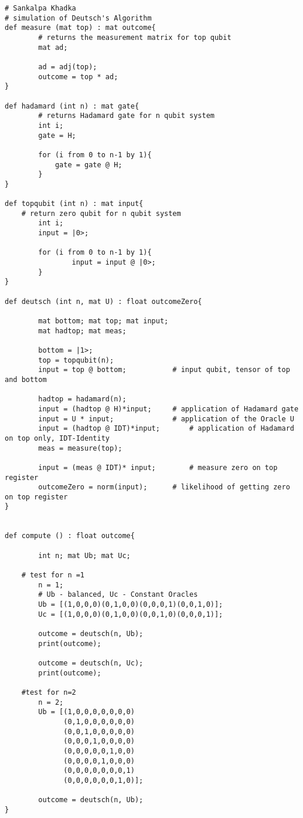 \begin{lstlisting}
# Sankalpa Khadka
# simulation of Deutsch's Algorithm
def measure (mat top) : mat outcome{
        # returns the measurement matrix for top qubit
        mat ad;

        ad = adj(top);
        outcome = top * ad;
}

def hadamard (int n) : mat gate{
        # returns Hadamard gate for n qubit system
        int i;
        gate = H;

        for (i from 0 to n-1 by 1){
            gate = gate @ H; 
        }
}

def topqubit (int n) : mat input{
	# return zero qubit for n qubit system
        int i;
        input = |0>;

        for (i from 0 to n-1 by 1){
                input = input @ |0>;
        }          
}

def deutsch (int n, mat U) : float outcomeZero{

        mat bottom; mat top; mat input;
        mat hadtop; mat meas;

        bottom = |1>;					
        top = topqubit(n);
        input = top @ bottom;			# input qubit, tensor of top and bottom
        
        hadtop = hadamard(n);		
        input = (hadtop @ H)*input;		# application of Hadamard gate
        input = U * input;				# application of the Oracle U
        input = (hadtop @ IDT)*input;		# application of Hadamard on top only, IDT-Identity
        meas = measure(top);

        input = (meas @ IDT)* input;		# measure zero on top register
        outcomeZero = norm(input);		# likelihood of getting zero on top register
}


def compute () : float outcome{

        int n; mat Ub; mat Uc;
	
	# test for n =1
        n = 1;
        # Ub - balanced, Uc - Constant Oracles
        Ub = [(1,0,0,0)(0,1,0,0)(0,0,0,1)(0,0,1,0)];
        Uc = [(1,0,0,0)(0,1,0,0)(0,0,1,0)(0,0,0,1)];

        outcome = deutsch(n, Ub);
        print(outcome);
        
        outcome = deutsch(n, Uc);
        print(outcome);

	#test for n=2
        n = 2;
        Ub = [(1,0,0,0,0,0,0,0) 
              (0,1,0,0,0,0,0,0)
              (0,0,1,0,0,0,0,0)
              (0,0,0,1,0,0,0,0) 
              (0,0,0,0,0,1,0,0) 
              (0,0,0,0,1,0,0,0)
              (0,0,0,0,0,0,0,1)
              (0,0,0,0,0,0,1,0)];

        outcome = deutsch(n, Ub);
}

\end{lstlisting}
